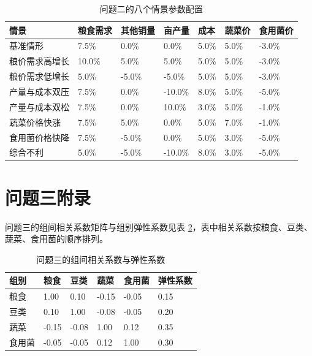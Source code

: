 \documentclass[bwprint]{gmcmthesis}
\begin{document}
\begin{appendices}
\begin{table}[htbp]
\centering
\renewcommand\arraystretch{1.2}
\begin{tabular}{|p{3.4cm}|p{1.8cm}|p{1.8cm}|p{1.8cm}|p{1.8cm}|p{1.8cm}|p{1.8cm}|}
  \hline
  情景  &  粮食需求  &  其他销量  &  亩产量  &  成本  &  蔬菜价  &  食用菌价 \\
  \hline
  基准情形  &  7.5\%  &  0.0\%  &  0.0\%  &  5.0\%  &  5.0\%  &  -3.0\% \\
  \hline
  粮价需求高增长  &  10.0\%  &  5.0\%  &  5.0\%  &  5.0\%  &  5.0\%  &  -3.0\% \\
  \hline
  粮价需求低增长  &  5.0\%  &  -5.0\%  &  -5.0\%  &  5.0\%  &  5.0\%  &  -3.0\% \\
  \hline
  产量与成本双压  &  7.5\%  &  0.0\%  &  -10.0\%  &  8.0\%  &  5.0\%  &  -5.0\% \\
  \hline
  产量与成本双松  &  7.5\%  &  0.0\%  &  10.0\%  &  3.0\%  &  5.0\%  &  -1.0\% \\
  \hline
  蔬菜价格快涨  &  7.5\%  &  5.0\%  &  0.0\%  &  5.0\%  &  7.0\%  &  -1.0\% \\
  \hline
  食用菌价格快降  &  7.5\%  &  -5.0\%  &  0.0\%  &  5.0\%  &  3.0\%  &  -5.0\% \\
  \hline
  综合不利  &  5.0\%  &  -5.0\%  &  -10.0\%  &  8.0\%  &  3.0\%  &  -5.0\% \\
  \hline
\end{tabular}
\caption{问题二的八个情景参数配置}
\label{tab:app2}
\end{table}

\section{问题三附录}

问题三的组间相关系数矩阵与组别弹性系数见表 \ref{tab:app3}，表中相关系数按粮食、豆类、蔬菜、食用菌的顺序排列。

\begin{table}[htbp]
\centering
\renewcommand\arraystretch{1.2}
\begin{tabular}{|p{2.6cm}|p{1.8cm}|p{1.8cm}|p{1.8cm}|p{1.8cm}|p{2.2cm}|}
  \hline
  组别  &  粮食  &  豆类  &  蔬菜  &  食用菌  &  弹性系数 \\
  \hline
  粮食  &  1.00  &  0.10  &  -0.15  &  -0.05  &  0.15 \\
  \hline
  豆类  &  0.10  &  1.00  &  -0.08  &  -0.05  &  0.20 \\
  \hline
  蔬菜  &  -0.15  &  -0.08  &  1.00  &  0.12  &  0.35 \\
  \hline
  食用菌  &  -0.05  &  -0.05  &  0.12  &  1.00  &  0.30 \\
  \hline
\end{tabular}
\caption{问题三的组间相关系数与弹性系数}
\label{tab:app3}
\end{table}


\end{appendices}
\end{document}
